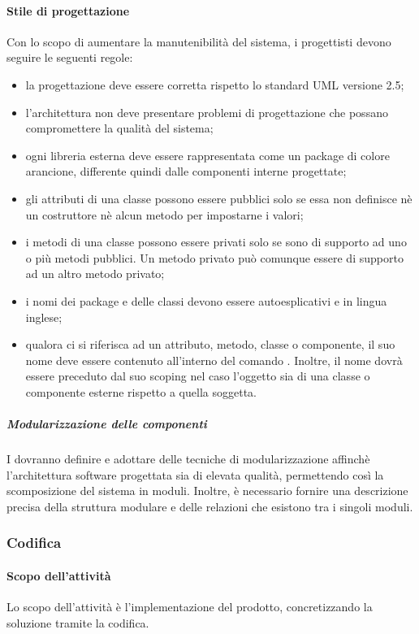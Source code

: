  \paragraph{Stile di progettazione}
 Con lo scopo di aumentare la manutenibilità del sistema, i progettisti devono seguire
 le seguenti regole:
 \begin{itemize}
 	\item la progettazione deve essere corretta rispetto lo standard UML versione 2.5;
 	\item l’architettura non deve presentare problemi di progettazione che possano compromettere la qualità del sistema;
 	\item ogni libreria esterna deve essere rappresentata come un package di colore arancione, differente quindi dalle componenti interne progettate;
 	\item gli attributi di una classe possono essere pubblici solo se essa non definisce nè un costruttore nè alcun metodo per impostarne i valori;
 	\item i metodi di una classe possono essere privati solo se sono di supporto ad uno o più metodi pubblici. Un metodo privato può comunque essere di supporto ad un altro metodo privato;
 	\item i nomi dei package e delle classi devono essere autoesplicativi e in lingua inglese;
 	\item qualora ci si riferisca ad un attributo, metodo, classe o componente, il suo nome deve essere contenuto all'interno del comando . Inoltre, il nome dovrà essere preceduto dal suo scoping nel caso l'oggetto sia di una classe o componente esterne rispetto a quella soggetta.
 \end{itemize}
 \subparagraph{Modularizzazione delle componenti}
 I \PJP{} dovranno definire e adottare delle tecniche di modularizzazione affinchè l’architettura software progettata sia di elevata qualità, permettendo così la scomposizione del sistema in moduli. Inoltre, è necessario fornire una descrizione precisa della struttura modulare e delle relazioni che esistono tra i singoli moduli.

 \subsubsection{Codifica}
 \paragraph{Scopo dell'attività}
 Lo scopo dell'attività è l'implementazione del prodotto, concretizzando la soluzione tramite la codifica.
